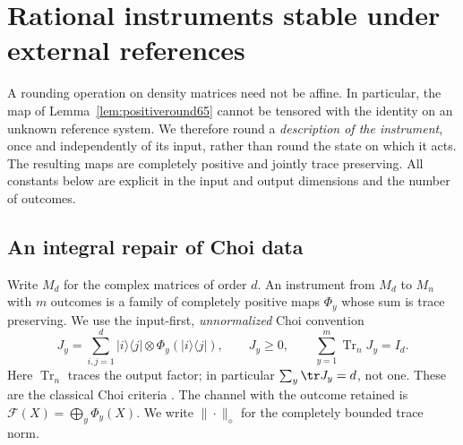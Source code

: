 \section{Rational instruments stable under external references}\label{sec:reference66}
A rounding operation on density matrices need not be affine. In
particular, the map of Lemma~\ref{lem:positiveround65} cannot be tensored
with the identity on an unknown reference system. We therefore round a
\emph{description of the instrument}, once and independently of its
input, rather than round the state on which it acts. The resulting
maps are completely positive and jointly trace preserving. All
constants below are explicit in the input and output dimensions and
the number of outcomes.

\subsection{An integral repair of Choi data}
Write $M_d$ for the complex matrices of order $d$. An instrument from
$M_d$ to $M_n$ with $m$ outcomes is a family of completely positive
maps $\Phi_y$ whose sum is trace preserving. We use the input-first,
\emph{unnormalized} Choi convention
\begin{equation}\label{eq:choiconvention66}
 J_y=\sum_{i,j=1}^d |i\rangle\langle j|\otimes
                     \Phi_y(|i\rangle\langle j|),\qquad
 J_y\ge0,\qquad \sum_{y=1}^m\operatorname{Tr}_{n}J_y=I_d.
\end{equation}
Here $\operatorname{Tr}_{n}$ traces the output factor; in particular
$\sum_y\tr J_y=d$, not one. These are the classical Choi criteria
\cite[Theorems~2.22 and~2.26]{Watrous65}. The channel with the outcome
retained is $\mathcal F(X)=\bigoplus_y\Phi_y(X)$. We write $\|\cdot\|_\diamond$
for the completely bounded trace norm.

